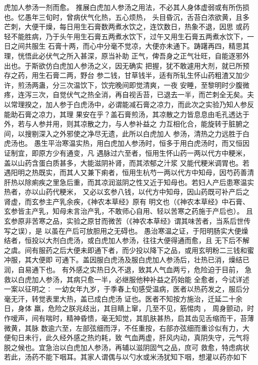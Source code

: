 \documentclass[a4paper,12pt,UTF8,twoside]{ctexbook}
\begin{document}
虎加人参汤一剂而愈。 
推展白虎加人参汤之用法，不必其人身体虚弱或有所伤损也。忆愚年三旬时，曾病伏气化热，五心烦热， 
头目昏沉，舌苔白浓欲黄，且多芒刺，大便干燥，每日用生石膏数两煮水饮之，连饮数日，热象不退，因思 
或药轻不能胜病，乃于头午用生石膏五两煮水饮下，过午又用生石膏五两煮水饮下，一日之间共服生 
石膏十两，而心中分毫不觉凉，大便亦未通下。踌躇再四，精思其理，恍悟此必伏气之所入甚深，原当补助 
正气，俾吾身之正气壮旺，自能逐邪外出也。于斯欲仿白虎加人参汤之义，因无确实 
把握，犹不敢遽用大剂，就已所预存之药，用生石膏二两，野台 
参二钱，甘草钱半，适有所轧生怀山药粗渣又加少许，煎汤两蛊，分三次温饮下，饮完晚间即觉清爽，一夜 
安睡，至黎明时少腹微疼，连泻三次，自觉伏气之热全消，再自视舌苔，已退去一半，而芒刺全无矣。夫 
以常理揆之，加人参于白虎汤中，必谓能减石膏之凉力，而此次之实验乃知人参反能助石膏之凉力，其理 
果安在乎？盖石膏煎汤，其凉散之力皆息息由毛孔透达于外，若与人参并用，则其凉散之力，与人参补益之 
力互相化合，能旋转于脏腑之间，以搜剔深入之外邪使之净尽无遗，此所以白虎加人 
参汤，清热之力远胜于白虎汤也。 
愚生平治寒温实热，用白虎加人参汤时，恒多于用白虎汤时，而又恒因证制宜，即原方少有通变，凡 
遇脉过六至者，恒用生怀山药一两以代方中粳米，盖以山药含蛋白质甚多，大能滋阴补肾，而其浓郁之汁浆 
又能代粳米调胃也。若遇阳明之热既实，而其人又兼下痢者，恒用生杭芍一两以代方中知母，因芍药善清 
肝热以除痢疾之里急后重，而其凉润滋阴之性又近于知母也。若妇人产后患寒温实热者，亦以山药代粳米， 
又必以玄参八钱，以代方中知母，因山药既可补产后之肾虚，而玄参主产乳余疾，《神农本草经》原有 
明文也（《神农本草经》中石膏、玄参皆主产乳，知母未言治产乳，不敢师心自用、轻以苦寒之药施于产后也）。 
且玄参原非苦寒之品，实验之原甘而微苦（《神农本草经》谓其味苦者，当系后世传写之误），是 
以虽在产后可放胆用之无碍也。 
愚治寒温之证，于阳明肠实大便燥结者，恒投以大剂白虎汤，或白虎加人参汤，往往大便得通而愈，且 
无下后不解之虞。间有服药之后大便未即通下者，而少投以降下之品，或用玄明粉二三钱和蜜冲服，其大便即 
可通下。盖因服白虎汤及服白虎加人参汤后，壮热已消，燥结已润，自易通下也。 
有外感之实热日久不退，致其人气血两亏，危险迫于目前， 
急救以白虎加人参汤，其病只愈一半，必继服他种补益之药始能 
全愈者，今试详述一案以征明之∶ 
一幼女年九岁，于季春上旬感受温病，医者以热药发之，服后分毫无汗，转觉表里大热，盖已成白虎汤 
证也。医者不知按方施治，迁延二十余日，身体 羸，危险之朕兆歧出，其目睛上窜，几至不见，筋惕肉 ， 
周身颤动，时作嗳声，间有喘时，精神昏愦，毫无知觉，其肌肤甚热，启其齿见舌缩而干，苔薄微黄，其脉 
数逾六至，左部弦细而浮，不任重按，右部亦弦细而重诊似有力，大便旬日未行，此久经外感之热灼耗，致 
气血两虚，肝风内动，真阴失守，元气将脱之候也。宜急治以白虎加人参汤，再辅以滋阴固气之品，庶可 
救愈，特虑病状若此，汤药不能下咽耳。其家人谓偶与以勺水或米汤犹知下咽，想灌以药亦如下 
\end{document}
